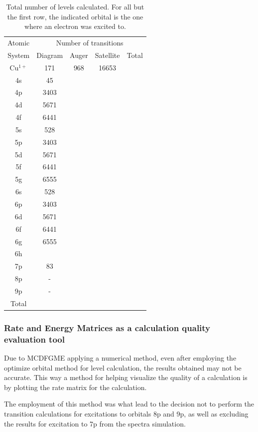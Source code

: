 \begin{table}[h!]
    \centering
    \caption{Total number of levels calculated. For all but the first row, the indicated orbital is the one where an electron was excited to.}
    \label{tab:tot_trans}
    \begin{tabular}{c||c|c|c||c}
        \toprule Atomic&\multicolumn{4}{c}{Number of transitions}\\
        System&Diagram&Auger&Satellite&Total\\
        \midrule
        Cu$^{1+}$ & 171 &968&16653\\ 
        4s& 45 \\
        4p & 3403 &\\
        4d & 5671 &\\
        4f & 6441\\
        5s & 528\\
        5p & 3403\\
        5d & 5671\\
        5f & 6441\\
        5g & 6555\\
        6s & 528\\
        6p & 3403\\
        6d & 5671\\
        6f & 6441\\
        6g & 6555\\
        6h\\
        7p & 83\\
        8p & -\\
        9p & -\\
        \midrule
        Total\\
        \bottomrule
    \end{tabular}
\end{table}


\subsubsection{Rate and Energy Matrices as a calculation quality evaluation tool}

Due to \gls{MCDFGME} applying a numerical method, even after employing the optimize orbital method for level calculation, the results obtained may not be accurate. This way a method for helping visualize the quality of a calculation is by plotting the rate matrix for the calculation.

The employment of this method was what lead to the decision not to perform the transition calculations for excitations to orbitals 8p and 9p, as well as excluding the results for excitation to 7p from the spectra simulation.

